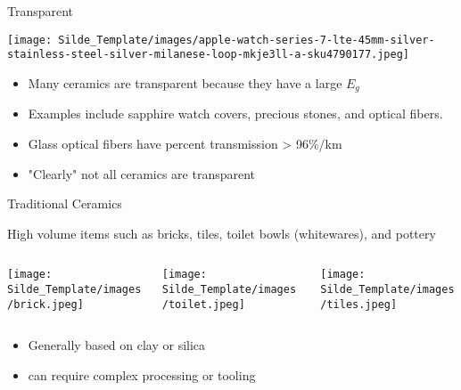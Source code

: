 \documentclass{libs/XJTLU_format}
\begin{document}
\begin{frame}{Transparent}

\centering
\texttt{[image: Silde\_Template/images/apple-watch-series-7-lte-45mm-silver-stainless-steel-silver-milanese-loop-mkje3ll-a-sku4790177.jpeg]}

\begin{itemize}
    \item Many ceramics are transparent because they have a large $E_g$
    \pause
    \item Examples include sapphire watch covers, precious stones, and optical fibers.
    \pause
    \item Glass optical fibers have percent transmission > 96\%/km
    \pause
    \item "Clearly" not all ceramics are transparent
\end{itemize}
    
\end{frame}

\begin{frame}{Traditional Ceramics}

High volume items such as bricks, tiles, toilet bowls (whitewares), and pottery
\vspace{1em}

\begin{columns}{\textwidth}
  \begin{column}{0.33\textwidth}
    \centering
    \texttt{[image: Silde\_Template/images/brick.jpeg]}
  \end{column}
  \begin{column}{0.33\textwidth}
  \centering
    \texttt{[image: Silde\_Template/images/toilet.jpeg]}
  \end{column}
    \begin{column}{0.33\textwidth}
    \centering
    \texttt{[image: Silde\_Template/images/tiles.jpeg]}
  \end{column}
\end{columns}
\pause
\begin{itemize}
    \item Generally based on clay or silica
    \item can require complex processing or tooling
\end{itemize}
\end{frame}
\end{document}
